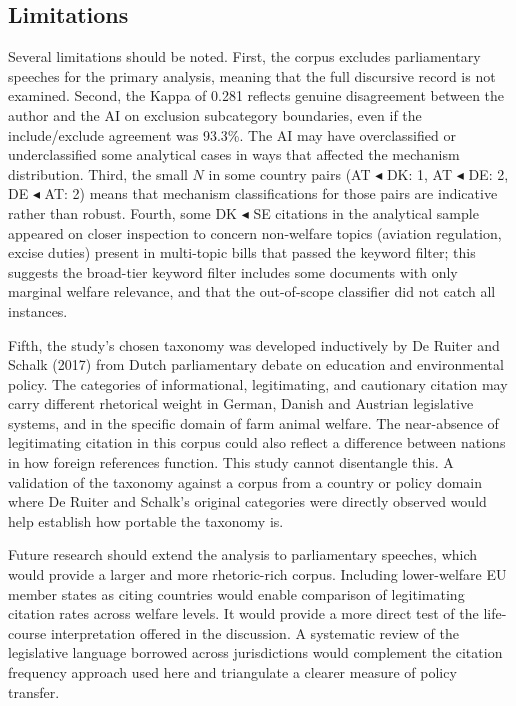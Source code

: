\documentclass[twocolumn, 10pt, a4paper]{article}
\begin{document}
\subsection{Limitations}

Several limitations should be noted. First, the corpus excludes parliamentary
speeches for the primary analysis, meaning that the full discursive record is not
examined. Second, the Kappa of 0.281 reflects genuine disagreement between the
author and the AI on exclusion subcategory boundaries, even if the include/exclude
agreement was 93.3\%. The AI may have overclassified or underclassified some
analytical cases in ways that affected the mechanism distribution. Third, the small
$N$ in some country pairs (AT $\blacktriangleleft$ DK: 1, AT $\blacktriangleleft$ DE: 2, DE $\blacktriangleleft$ AT: 2) means
that mechanism classifications for those pairs are indicative rather than robust.
Fourth, some DK $\blacktriangleleft$ SE citations in the analytical sample appeared on closer
inspection to concern non-welfare topics (aviation regulation, excise duties) present
in multi-topic bills that passed the keyword filter; this suggests the broad-tier
keyword filter includes some documents with only marginal welfare relevance, and that
the out-of-scope classifier did not catch all instances.

Fifth, the study's chosen taxonomy was developed inductively by De Ruiter and Schalk
(2017) from Dutch parliamentary debate on education and environmental policy. The
categories of informational, legitimating, and cautionary citation may carry
different rhetorical weight in German, Danish and Austrian legislative systems, and
in the specific domain of farm animal welfare. The near-absence of legitimating
citation in this corpus could also reflect a difference between nations in how
foreign references function. This study cannot disentangle this. A validation of the
taxonomy against a corpus from a country or policy domain where De Ruiter and
Schalk's original categories were directly observed would help establish how portable
the taxonomy is.

Future research should extend the analysis to parliamentary speeches, which would
provide a larger and more rhetoric-rich corpus. Including lower-welfare EU member
states as citing countries would enable comparison of legitimating citation rates
across welfare levels. It would provide a more direct test of the life-course
interpretation offered in the discussion. A systematic review of the legislative
language borrowed across jurisdictions would complement the citation frequency
approach used here and triangulate a clearer measure of policy transfer.
\end{document}
